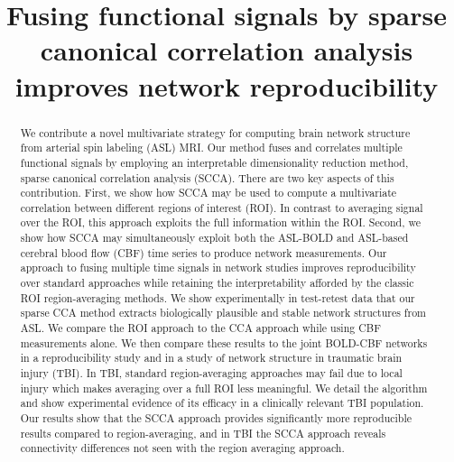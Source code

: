 \documentclass{llncs}
\title{Fusing functional signals by sparse canonical correlation analysis improves network reproducibility}
\begin{document}
\maketitle
\begin{abstract}
We contribute a novel multivariate strategy for computing brain network structure from arterial spin labeling (ASL) MRI.  Our method fuses and correlates multiple functional signals by employing an interpretable dimensionality reduction method, sparse canonical correlation analysis (SCCA).  There are two key aspects of this contribution.  First, we show how SCCA may be used to compute a multivariate correlation between different regions of interest (ROI).  In contrast to averaging signal over the ROI, this approach exploits the full information within the ROI.  Second, we show how SCCA may simultaneously exploit both the ASL-BOLD and ASL-based cerebral blood flow (CBF) time series to produce network measurements.  Our approach to fusing multiple time signals in network studies improves reproducibility over standard approaches while retaining the interpretability afforded by the classic ROI region-averaging methods.  We show experimentally in test-retest data that our sparse CCA method extracts biologically plausible and stable network structures from ASL.  We compare the ROI approach to the CCA approach while using CBF measurements alone.  We then compare these results to the joint BOLD-CBF networks in a reproducibility study and in a study of network structure in traumatic brain injury (TBI).  In TBI, standard region-averaging approaches may fail due to local injury which makes averaging over a full ROI less meaningful.  We detail the algorithm and show experimental evidence of its efficacy in a clinically relevant TBI population.  Our results show that the SCCA approach provides significantly more reproducible results compared to region-averaging, and in TBI the SCCA approach reveals connectivity differences not seen with the region averaging approach.
\end{abstract}
\end{document}

